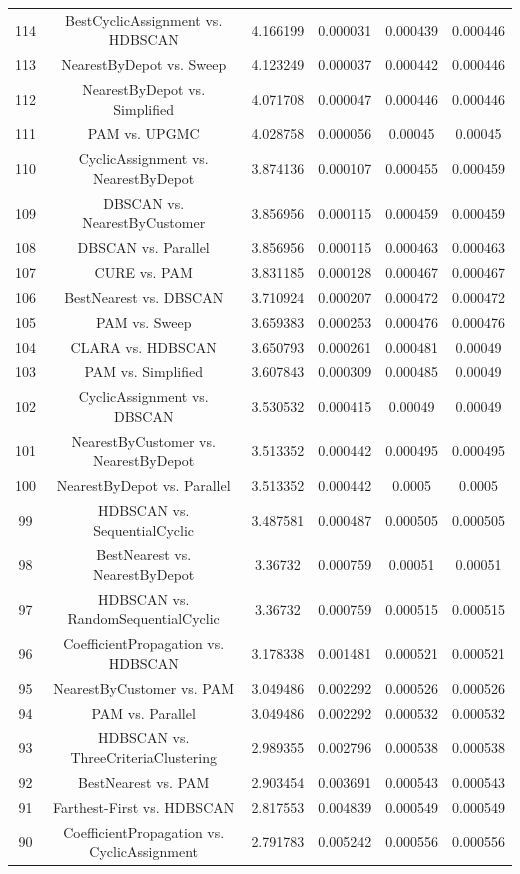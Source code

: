 \documentclass[a4paper,10pt]{article}
\begin{document}
\begin{landscape}
\begin{table}[!htp]
\begin{tabular}{cccccc}
114&BestCyclicAssignment vs. HDBSCAN&4.166199&0.000031&0.000439&0.000446\\
113&NearestByDepot vs. Sweep&4.123249&0.000037&0.000442&0.000446\\
112&NearestByDepot vs. Simplified&4.071708&0.000047&0.000446&0.000446\\
111&PAM vs. UPGMC&4.028758&0.000056&0.00045&0.00045\\
110&CyclicAssignment vs. NearestByDepot&3.874136&0.000107&0.000455&0.000459\\
109&DBSCAN vs. NearestByCustomer&3.856956&0.000115&0.000459&0.000459\\
108&DBSCAN vs. Parallel&3.856956&0.000115&0.000463&0.000463\\
107&CURE vs. PAM&3.831185&0.000128&0.000467&0.000467\\
106&BestNearest vs. DBSCAN&3.710924&0.000207&0.000472&0.000472\\
105&PAM vs. Sweep&3.659383&0.000253&0.000476&0.000476\\
104&CLARA vs. HDBSCAN&3.650793&0.000261&0.000481&0.00049\\
103&PAM vs. Simplified&3.607843&0.000309&0.000485&0.00049\\
102&CyclicAssignment vs. DBSCAN&3.530532&0.000415&0.00049&0.00049\\
101&NearestByCustomer vs. NearestByDepot&3.513352&0.000442&0.000495&0.000495\\
100&NearestByDepot vs. Parallel&3.513352&0.000442&0.0005&0.0005\\
99&HDBSCAN vs. SequentialCyclic&3.487581&0.000487&0.000505&0.000505\\
98&BestNearest vs. NearestByDepot&3.36732&0.000759&0.00051&0.00051\\
97&HDBSCAN vs. RandomSequentialCyclic&3.36732&0.000759&0.000515&0.000515\\
96&CoefficientPropagation vs. HDBSCAN&3.178338&0.001481&0.000521&0.000521\\
95&NearestByCustomer vs. PAM&3.049486&0.002292&0.000526&0.000526\\
94&PAM vs. Parallel&3.049486&0.002292&0.000532&0.000532\\
93&HDBSCAN vs. ThreeCriteriaClustering&2.989355&0.002796&0.000538&0.000538\\
92&BestNearest vs. PAM&2.903454&0.003691&0.000543&0.000543\\
91&Farthest-First vs. HDBSCAN&2.817553&0.004839&0.000549&0.000549\\
90&CoefficientPropagation vs. CyclicAssignment&2.791783&0.005242&0.000556&0.000556\\

\end{tabular}
\end{table}
\end{landscape}
\end{document}
